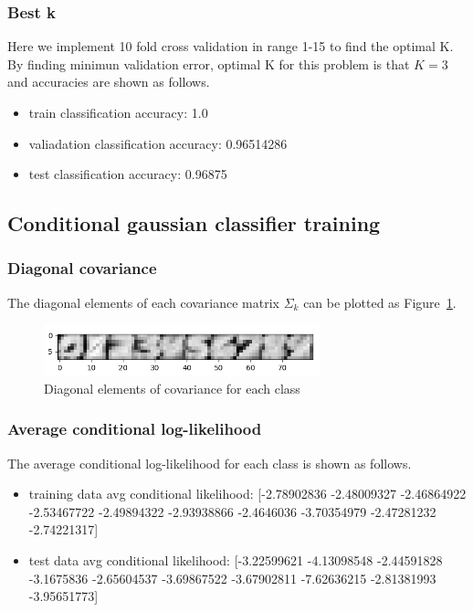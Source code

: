 \documentclass[a4paper]{article}
\begin{document}
\subsubsection{Best k}

Here we implement 10 fold cross validation in range 1-15 to find the optimal K. By finding minimun validation error, optimal K for this problem is that $K=3$ and accuracies are shown as follows.

\begin{itemize}
    \item train classification accuracy: 1.0
    \item valiadation classification accuracy: 0.96514286
    \item test classification accuracy: 0.96875
\end{itemize}

\subsection{Conditional gaussian classifier training}

\subsubsection{Diagonal covariance}

The diagonal elements of each covariance matrix $\Sigma_k$ can be plotted as Figure~\ref{fig: Diagomal_covariance}.

\begin{figure}[htbp]
\centering
\includegraphics[width = 8cm]{Diagomal_covariance}
\caption{Diagonal elements of covariance for each class}
\label{fig: Diagomal_covariance}
\end{figure}

\subsubsection{Average conditional log-likelihood}

The average conditional log-likelihood for each class is shown as follows.

\begin{itemize}
    \item training data avg conditional likelihood: [-2.78902836 -2.48009327 -2.46864922 -2.53467722 -2.49894322 -2.93938866
 -2.4646036  -3.70354979 -2.47281232 -2.74221317]
    \item test data avg conditional likelihood: [-3.22599621 -4.13098548 -2.44591828 -3.1675836  -2.65604537 -3.69867522
 -3.67902811 -7.62636215 -2.81381993 -3.95651773]
\end{itemize}
\end{document}
